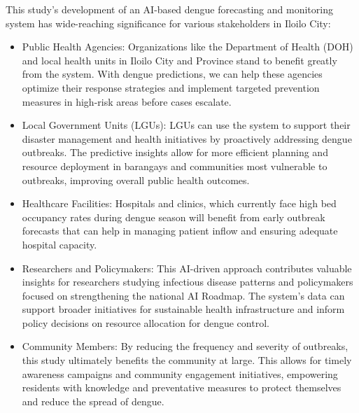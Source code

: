 This study’s development of an AI-based dengue forecasting and monitoring system has wide-reaching significance for various stakeholders in Iloilo City:

\begin{itemize}
\item  Public Health Agencies: Organizations like the Department of Health (DOH) and local health units in Iloilo City and Province stand to benefit greatly from the system. With dengue predictions, we can help these agencies optimize their response strategies and implement targeted prevention measures in high-risk areas before cases escalate.
\end{itemize}

\begin{itemize} 
\item Local Government Units (LGUs): LGUs can use the system to support their disaster management and health initiatives by proactively addressing dengue outbreaks. The predictive insights allow for more efficient planning and resource deployment in barangays and communities most vulnerable to outbreaks, improving overall public health outcomes.
\end{itemize}


\begin{itemize} 
\item Healthcare Facilities: Hospitals and clinics, which currently face high bed occupancy rates during dengue season will benefit from early outbreak forecasts that can help in managing patient inflow and ensuring adequate hospital capacity. 
 \end{itemize}


\begin{itemize} 
\item Researchers and Policymakers: This AI-driven approach contributes valuable insights for researchers studying infectious disease patterns and policymakers focused on strengthening the national AI Roadmap. The system's data can support broader initiatives for sustainable health infrastructure and inform policy decisions on resource allocation for dengue control.
\end{itemize}


\begin{itemize} 
\item Community Members: By reducing the frequency and severity of outbreaks, this study ultimately benefits the community at large. This allows for timely awareness campaigns and community engagement initiatives, empowering residents with knowledge and preventative measures to protect themselves and reduce the spread of dengue.
\end{itemize}


